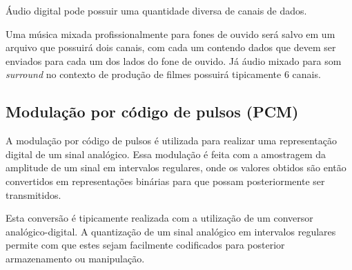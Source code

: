 Áudio digital pode possuir uma quantidade diversa de canais de dados.

Uma música mixada profissionalmente para fones de ouvido será salvo em um arquivo que possuirá dois canais, com cada um contendo dados que devem ser enviados para cada um dos lados do fone de ouvido. Já áudio mixado para som \textit{surround} no contexto de produção de filmes possuirá tipicamente 6 canais.

\subsection{Modulação por código de pulsos (PCM)}
A modulação por código de pulsos é utilizada para realizar uma representação digital de um sinal analógico. Essa modulação é feita com a amostragem da amplitude de um sinal em intervalos regulares, onde os valores obtidos são então convertidos em representações binárias para que possam posteriormente ser transmitidos.

Esta conversão é tipicamente realizada com a utilização de um conversor analógico-digital. A quantização de um sinal analógico em intervalos regulares permite com que estes sejam facilmente codificados para posterior armazenamento ou manipulação.





